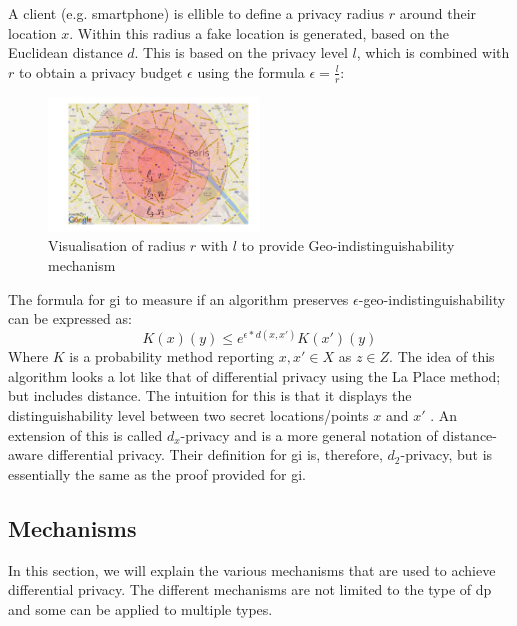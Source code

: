 A client (e.g. smartphone) is ellible to define a privacy radius $r$ around their location $x$.
Within this radius a fake location is generated, based on the Euclidean distance $d$.
This is based on the privacy level $l$, which is combined with $r$ to obtain a privacy budget $\epsilon$ using the formula $\epsilon = \frac{l}{r}$:
\begin{figure}[H]
  \includegraphics[width=0.5\textwidth]{TheorethicalFramework/geo-indistinguishability.png}
  \caption{Visualisation of radius $r$ with $l$ to provide Geo-indistinguishability mechanism \citep{DBLP:journals/corr/abs-1212-1984}}
  \label{fig:geo-indistinguishability}
\end{figure}

The formula for \gls{gi} to measure if an algorithm preserves $\epsilon$-geo-indistinguishability can be expressed as:
\begin{equation}
  K(x)(y) \le e^{\epsilon * d(x,x')} K(x')(y)
  \label{algo:2d-geo-indistinguishability}
\end{equation}
Where $K$ is a probability method reporting $x, x' \in X$ as $z \in Z$.
The idea of this algorithm looks a lot like that of differential privacy using the La Place method; but includes distance.
The intuition for this is that it displays the distinguishability level between two secret locations/points $x$ and $x'$ \citep{chatzikokolakis_constructing_2015}.
An extension of this is called $d_x$-privacy and is a more general notation of distance-aware differential privacy.
Their definition for \gls{gi} is, therefore, $d_2$-privacy, but is essentially the same as the proof provided for \gls{gi}.


\newpage
\subsection{Mechanisms}
In this section, we will explain the various mechanisms that are used to achieve differential privacy.
The different mechanisms are not limited to the type of \gls{dp} and some can be applied to multiple types.
